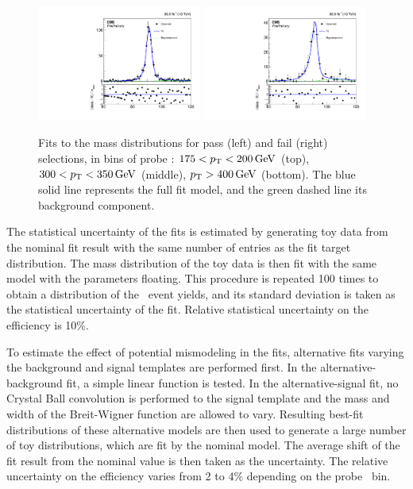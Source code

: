 \begin{figure}[htbp]
\begin{center}
    \includegraphics[width=0.48\textwidth]{Calibration/Figures/idsf/fit_data_pass_pt_400_6500.pdf}
    \includegraphics[width=0.48\textwidth]{Calibration/Figures/idsf/fit_data_fail_pt_400_6500.pdf}
    \caption{
      Fits to the mass distributions for pass (left) and fail (right) selections, in bins of probe \pt: 
      $175 < p_{\mathrm{T}} < 200\,\text{Ge\hspace{-.08em}V}$ (top), 
      $300 < p_{\mathrm{T}} < 350\,\text{Ge\hspace{-.08em}V}$ (middle), 
      $p_{\mathrm{T}} > 400\,\text{Ge\hspace{-.08em}V}$ (bottom). 
      The blue solid line represents the full fit model, and the green dashed line its background component.
    }
    \label{fig:idsf_fits}
  \end{center}
\end{figure}

The statistical uncertainty of the fits is estimated by generating toy data from the nominal fit result with the same number of entries as the fit target distribution. 
The mass distribution of the toy data is then fit with the same model with the parameters floating. 
This procedure is repeated 100 times to obtain a distribution of the \Zee\ event yields, and its standard deviation is taken as the statistical uncertainty of the fit. 
Relative statistical uncertainty on the efficiency is 10\%. %

To estimate the effect of potential mismodeling in the fits, alternative fits varying the background and signal templates are performed first. 
In the alternative-background fit, a simple linear function is tested.
In the alternative-signal fit, no Crystal Ball convolution is performed to the signal template and the mass and width of the Breit-Wigner function are allowed to vary. 
Resulting best-fit distributions of these alternative models are then used to generate a large number of toy distributions, which are fit by the nominal model. 
The average shift of the fit result from the nominal value is then taken as the uncertainty. The relative uncertainty on the efficiency varies from 2 to 4\% depending on the probe \pt\ bin. %

